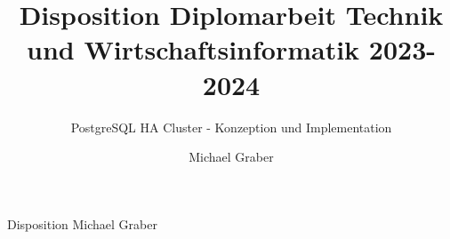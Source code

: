 \documentclass{grathesis}
\begin{document}
    \title{Disposition Diplomarbeit Technik und Wirtschaftsinformatik 2023-2024}
    \subtitle{PostgreSQL HA Cluster - Konzeption und Implementation} %
    \author{Michael Graber}

    \maketitle

    \begin{zusammenfassung}
        Disposition Michael Graber
    \end{zusammenfassung}


    \tableofcontents
    
    \startThesis %
    
    
    
    
\end{document}
